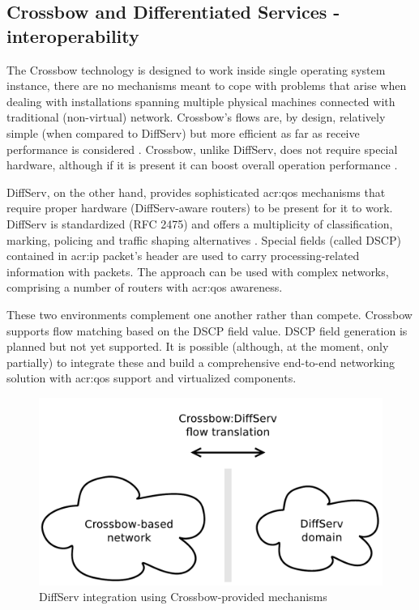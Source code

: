 \documentclass[11pt]{book}
\begin{document}
      \subsection{Crossbow and Differentiated Services - interoperability}
      \label{sub:sol:diffserv}

        The Crossbow technology is designed to work inside single operating system instance, there are no mechanisms
        meant to cope with problems that arise when dealing with installations spanning multiple physical machines
        connected with traditional (non-virtual) network. Crossbow's flows are, by design, relatively simple (when
        compared to DiffServ) but more efficient as far as receive performance is considered \cite{xbow-vertically}.
        Crossbow, unlike DiffServ, does not require special hardware, although if it is present it can boost overall
        operation performance \cite{xbow-vertically}.

        DiffServ, on the other hand, provides sophisticated \gls{acr:qos} mechanisms that require proper hardware (DiffServ-aware
        routers) to be present for it to work. DiffServ is standardized (RFC 2475) and offers a multiplicity of
        classification, marking, policing and traffic shaping alternatives \cite{rfc2475}. Special fields (called DSCP)
        contained in \gls{acr:ip} packet's header are used to carry processing-related information with packets. The approach can
        be used with complex networks, comprising a number of routers with \gls{acr:qos} awareness.

        These two environments complement one another rather than compete. Crossbow supports flow matching based on the
        DSCP field value. DSCP field generation is planned but not yet supported. It is possible (although, at the
        moment, only partially) to integrate these and build a comprehensive end-to-end networking solution with \gls{acr:qos}
        support and virtualized components.

        \begin{figure}[H]
          \begin{center}
            \includegraphics[width=.7\textwidth]{img/solaris/xbow-diffserv.pdf}
          \end{center}

          \caption{DiffServ integration using Crossbow-provided mechanisms}
        \end{figure}
\end{document}
